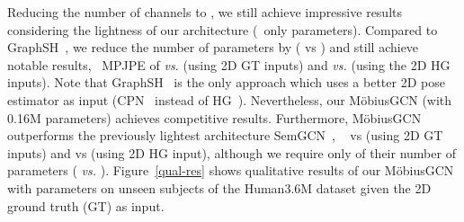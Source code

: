 \documentclass[runningheads]{llncs}
\begin{document}
Reducing the number of channels to , we still achieve impressive results considering the lightness of our architecture (\ie~only  parameters).
Compared to GraphSH~\cite{xu2021graph}, we reduce the number of parameters by  ( vs ) and still achieve notable results, \ie~MPJPE of  \emph{vs.}  (using 2D GT inputs) and  \emph{vs.}  (using the 2D HG inputs).
Note that GraphSH~\cite{xu2021graph} is the only approach which uses a better 2D pose estimator as input (CPN~\cite{Chen_2018_CVPR} instead of HG~\cite{newell2016stacked}). Nevertheless, our M\"obiusGCN (with 0.16M parameters) achieves competitive results.
Furthermore, M\"obiusGCN outperforms the previously lightest architecture SemGCN~\cite{zhaoCVPR19semantic}, \ie~ vs  (using 2D GT inputs) and  vs  (using 2D HG input), although we require only  of their number of parameters ( \emph{vs.} ).
Figure~\ref{qual-res} shows qualitative results of our M\"obiusGCN with  parameters on unseen subjects of the Human3.6M dataset given the 2D ground truth (GT) as input.
\vspace{-25px}
\begin{center}
 
\label{mpi-inf-3dhp}
 \end{center}
 \vspace{-25px}
\end{document}
